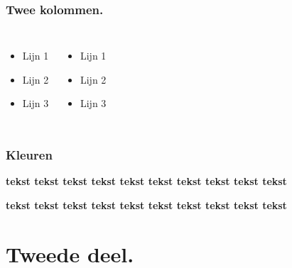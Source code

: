 \documentclass[aspectratio=169]{beamer}
\begin{document}
\begin{frame}
  \frametitle{Twee kolommen.}

  \begin{columns}[c]

    \begin{itemize}
    \item Lijn 1
    \item Lijn 2
    \item Lijn 3
    \end{itemize}

    \begin{itemize}
    \item Lijn 1
    \item Lijn 2
    \item Lijn 3
    \end{itemize}

  \end{columns}
\end{frame}

\begin{frame}
  \frametitle{Kleuren}
  
  \textbf{\textcolor{hgdarkgreen}{tekst}
  \textcolor{hgpink}{tekst}
  \textcolor{hgochre}{tekst}
  \textcolor{hgorange}{tekst}
  \textcolor{hgpurple}{tekst}
  \textcolor{hgblue}{tekst}
  \textcolor{hglightgreen}{tekst}
  \textcolor{hgbrown}{tekst}
  \textcolor{hggrey}{tekst}
  \textcolor{hgyellow}{tekst}}

  \textbf{\colorbox{hgdarkgreen}{tekst}
  \colorbox{hgpink}{tekst}
  \colorbox{hgochre}{tekst}
  \colorbox{hgorange}{tekst}
  \colorbox{hgpurple}{tekst}
  \colorbox{hgblue}{tekst}
  \colorbox{hglightgreen}{tekst}
  \colorbox{hgbrown}{tekst}
  \colorbox{hggrey}{tekst}
  \colorbox{hgyellow}{tekst}}

\end{frame}

\section{Tweede deel.}
\end{document}
